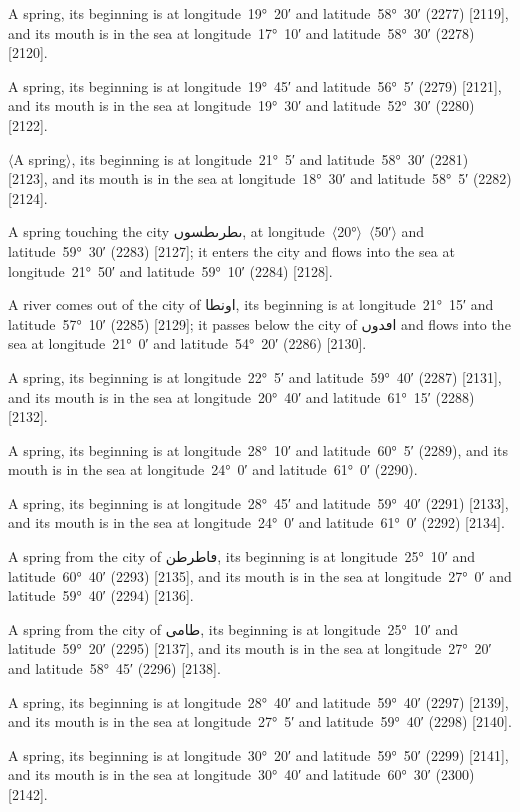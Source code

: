 \documentclass[11pt]{article}
\newcommand{\Pg}[1]{\marginpar{\footnotesize #1}}
\newcommand{\Ang}[1]{\ensuremath{#1}}
\begin{document}
A spring, its beginning is at longitude~19°~20′ and latitude~58°~30′ (2277) [2119], and its mouth is in the sea at longitude~17°~10′ and latitude~58°~30′ (2278) [2120].

A spring, its beginning is at longitude~19°~45′ and latitude~56°~5′ (2279) [2121], and its mouth is in the sea at longitude~19°~30′ and latitude~52°~30′ (2280) [2122].

\Ang{\langle}A spring\Ang{\rangle}, its beginning is at longitude~21°~5′ and latitude~58°~30′ (2281) [2123], and its mouth is in the sea at longitude~18°~30′ and latitude~58°~5′ (2282) [2124].

A spring touching the city \textarabic{ٮطرٮطسوں}, at longitude~\Ang{\langle}20°\Ang{\rangle}~\Ang{\langle}50′\Ang{\rangle} and latitude~59°~30′ (2283) [2127]\Pg{p. 151}; it enters the city and flows into the sea at longitude~21°~50′ and latitude~59°~10′ (2284) [2128].

A river comes out of the city of \textarabic{اونطا}, its beginning is at longitude~21°~15′ and latitude~57°~10′ (2285) [2129]; it passes below the city of \textarabic{اڡدوں} and flows into the sea at longitude~21°~0′ and latitude~54°~20′ (2286) [2130].

A spring, its beginning is at longitude~22°~5′ and latitude~59°~40′ (2287) [2131], and its mouth is in the sea at longitude~20°~40′ and latitude~61°~15′ (2288) [2132].

A spring, its beginning is at longitude~28°~10′ and latitude~60°~5′ (2289), and its mouth is in the sea at longitude~24°~0′ and latitude~61°~0′ (2290).

A spring, its beginning is at longitude~28°~45′ and latitude~59°~40′ (2291) [2133], and its mouth is in the sea at longitude~24°~0′ and latitude~61°~0′ (2292) [2134].

A spring from the city of \textarabic{ڡاطرطن}, its beginning is at longitude~25°~10′ and latitude~60°~40′ (2293) [2135], and its mouth is in the sea at longitude~27°~0′ and latitude~59°~40′ (2294) [2136].

A spring from the city of \textarabic{طامى}, its beginning is at longitude~25°~10′ and latitude~59°~20′ (2295) [2137], and its mouth is in the sea at longitude~27°~20′ and latitude~58°~45′ (2296) [2138].

A spring, its beginning is at longitude~28°~40′ and latitude~59°~40′ (2297) [2139], and its mouth is in the sea at longitude~27°~5′ and latitude~59°~40′ (2298) [2140].

A spring, its beginning is at longitude~30°~20′ and latitude~59°~50′ (2299) [2141], and its mouth is in the sea at longitude~30°~40′ and latitude~60°~30′ (2300) [2142].
\end{document}
